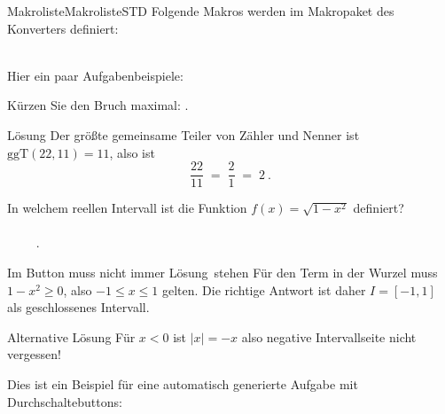 \begin{MXContent}{Makroliste}{Makroliste}{STD}
Folgende Makros werden im Makropaket des Konverters definiert:
\ \\ \ \\
\end{MXContent}

\begin{MExercises}

Hier ein paar Aufgabenbeispiele:

\begin{MExercise}
Kürzen Sie den Bruch maximal: \: .
\begin{MHint}{Lösung}
Der größte gemeinsame Teiler von Zähler und Nenner ist $\textrm{ggT}(22,11)=11$, also ist
$$
\frac{22}{11} \;=\; \frac{2}{1} \;=\; 2\: .
$$
\end{MHint}
\end{MExercise}

\begin{MExercise}
    In welchem reellen Intervall ist die Funktion $f(x)=\sqrt{1-x^2}$ definiert?
    \ \\ \ \\
    \ \ \ \ \: .
    \ \\
    \begin{MHint}{Im Button muss nicht immer \glqq Lösung\grqq\ stehen}
        Für den Term in der Wurzel muss $1-x^2\geq 0$, also $-1\leq x\leq 1$ gelten.
        Die richtige Antwort ist daher $I=[-1,1]$ als geschlossenes Intervall.
    \end{MHint}
    \begin{MHint}{Alternative Lösung}
        Für $x<0$ ist $|x|=-x$ also negative Intervallseite nicht vergessen!
    \end{MHint}
\end{MExercise}

Dies ist ein Beispiel für eine automatisch generierte Aufgabe mit Durchschaltebuttons:


\end{MExercises}


